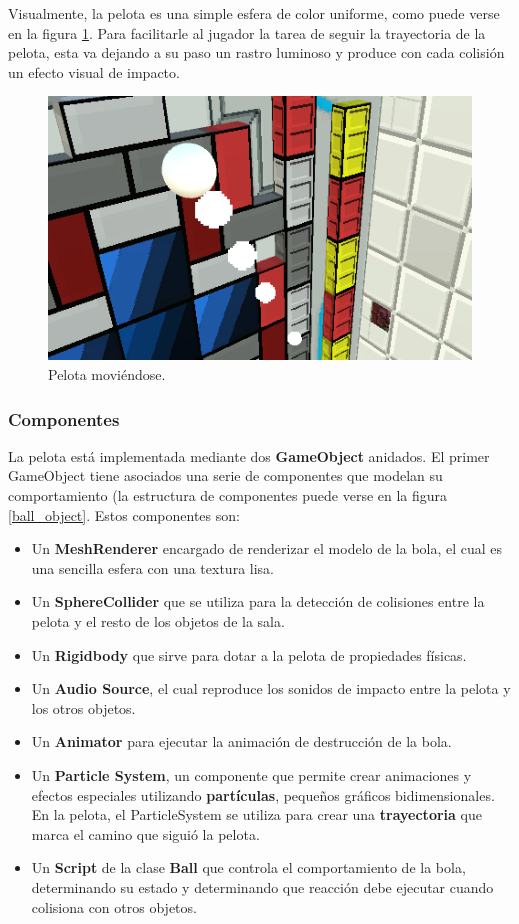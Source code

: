 Visualmente, la pelota es una simple esfera de color uniforme, como puede verse en la figura \ref{ball}. Para facilitarle al jugador la tarea de seguir la trayectoria de la pelota, esta va dejando a su paso un rastro luminoso y produce con cada colisión un efecto visual de impacto.
\begin{figure}[h]
	\includegraphics[width=1\textwidth]{images/estructura/fisica/ball_moving}
	\centering
	\caption{Pelota moviéndose.}
	\label{ball}
\end{figure}

\subsubsection{Componentes}
La pelota está implementada mediante dos \textbf{GameObject} anidados. El primer GameObject tiene asociados una serie de componentes que modelan su comportamiento (la estructura de componentes puede verse en la figura \ref{ball_object}. Estos componentes son:
\begin{itemize}
\item Un \textbf{MeshRenderer} encargado de renderizar el modelo de la bola, el cual es una sencilla esfera con una textura lisa.
\item Un \textbf{SphereCollider} que se utiliza para la detección de colisiones entre la pelota y el resto de los objetos de la sala.
\item Un \textbf{Rigidbody} que sirve para dotar a la pelota de propiedades físicas.
\item Un \textbf{Audio Source}, el cual reproduce los sonidos de impacto entre la pelota y los otros objetos.
\item Un \textbf{Animator} para ejecutar la animación de destrucción de la bola.
\item Un \textbf{Particle System}, un componente que permite crear animaciones y efectos especiales utilizando \textbf{partículas}, pequeños gráficos bidimensionales. En la pelota, el ParticleSystem se utiliza para crear una \textbf{trayectoria} que marca el camino que siguió la pelota.
\item Un \textbf{Script} de la clase \textbf{Ball} que controla el comportamiento de la bola, determinando su estado y determinando que reacción debe ejecutar cuando colisiona con otros objetos.
\end{itemize}

